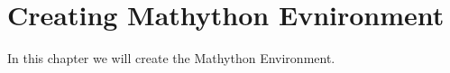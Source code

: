 
\chapter{Creating Mathython Evnironment}

In this chapter we will create the {\color{cyan} Mathython}  Environment.